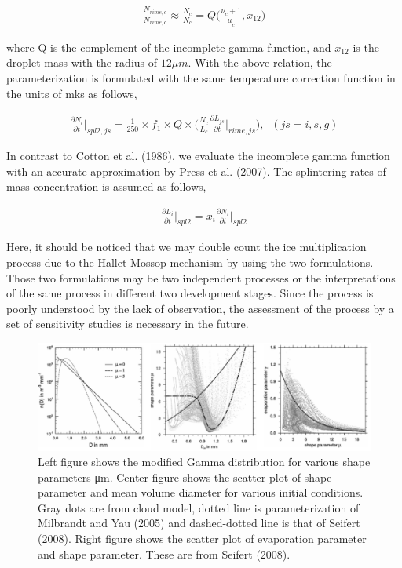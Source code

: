 \begin{eqnarray}
\frac{N_{rime,c}}{N_{rime,c}}\approx\frac{N_{c}}{N_{c}}=Q\bigl(\frac{\nu_{c}+1}{\mu_{c}},x_{12}\bigr)\label{sn215}
\end{eqnarray}

where Q is the complement of the incomplete gamma function, and $x_{12}$ is the droplet mass with the radius of $12 \mu m$. With the above relation, the parameterization is formulated with the same temperature correction function in the units of mks as follows,

\begin{eqnarray}
\frac{\partial N_{i}}{\partial t}\Bigr|_{spl2,js}=\frac{1}{250}\times f_{1}\times Q\times\bigl(\frac{N_{c}}{L_{c}}\frac{\partial L_{js}}{\partial t}\Bigr|_{rime,js}\bigr),\;\;(js=i,s,g)\label{sn216}
\end{eqnarray}

In contrast to Cotton et al. (1986), we evaluate the incomplete gamma function with an accurate approximation by Press et al. (2007). The splintering rates of mass concentration is assumed as follows,

\begin{eqnarray}
\frac{\partial L_{i}}{\partial t}\Bigr|_{spl2} = \bar{x_{i}}\frac{\partial N_{i}}{\partial t}\Bigr|_{spl2}\label{sn217}
\end{eqnarray}

Here, it should be noticed that we may double count the ice multiplication process due to the Hallet-Mossop mechanism by using the two formulations. Those two formulations may be two independent processes or the interpretations of the same process in different two development stages. Since the process is poorly understood by the lack of observation, the assessment of the process by a set of sensitivity studies is necessary in the future.

\begin{figure}[htpb]
\begin{center}
\includegraphics[scale=0.75]{./figure/mod_gamma_dist.eps}
\end{center}
\caption{Left figure shows the modified Gamma distribution for various shape parameters μm. Center figure shows the scatter plot of shape parameter and mean volume diameter for various initial conditions. Gray dots are from cloud model, dotted line is parameterization of Milbrandt and Yau (2005) and dashed-dotted line is that of Seifert (2008). Right figure shows the scatter plot of evaporation parameter and shape parameter. These are from Seifert (2008).}
\label{figsn2-17}
\end{figure}

